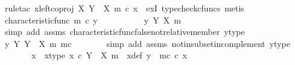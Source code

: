 \begin{isabellebody}
\ {\isacharparenleft}{\kern0pt}rule{\isacharunderscore}{\kern0pt}tac\ x{\isacharequal}{\kern0pt}{\isachardoublequoteopen}left{\isacharunderscore}{\kern0pt}coproj\ X\ {\isacharparenleft}{\kern0pt}Y\ {\isasymsetminus}\ {\isacharparenleft}{\kern0pt}X{\isacharcomma}{\kern0pt}\ m{\isacharparenright}{\kern0pt}{\isacharparenright}{\kern0pt}\ {\isasymcirc}\isactrlsub c\ x{\isachardoublequoteclose}\ \ exI{\isacharcomma}{\kern0pt}\ typecheck{\isacharunderscore}{\kern0pt}cfuncs{\isacharcomma}{\kern0pt}\ metis{\isacharparenright}{\kern0pt}\isanewline
\ \ \isamarkupfalse%
\isanewline
\ \ \ \ \isamarkupfalse%
\ {\isachardoublequoteopen}characteristic{\isacharunderscore}{\kern0pt}func\ m\ {\isasymcirc}\isactrlsub c\ y\ {\isacharequal}{\kern0pt}\ {\isasymf}{\isachardoublequoteclose}\isanewline
\ \ \ \ \isamarkupfalse%
\ \isamarkupfalse%
\ {\isachardoublequoteopen}{\isasymnot}\ y\ {\isasymin}\isactrlbsub Y\isactrlesub \ {\isacharparenleft}{\kern0pt}X{\isacharcomma}{\kern0pt}\ m{\isacharparenright}{\kern0pt}{\isachardoublequoteclose}\isanewline
\ \ \ \ \ \ \isamarkupfalse%
\ {\isacharparenleft}{\kern0pt}simp\ add{\isacharcolon}{\kern0pt}\ assms\ characteristic{\isacharunderscore}{\kern0pt}func{\isacharunderscore}{\kern0pt}false{\isacharunderscore}{\kern0pt}not{\isacharunderscore}{\kern0pt}relative{\isacharunderscore}{\kern0pt}member\ y{\isacharunderscore}{\kern0pt}type{\isacharparenright}{\kern0pt}\isanewline
\ \ \ \ \isamarkupfalse%
\ \isamarkupfalse%
\ {\isachardoublequoteopen}y\ {\isasymin}\isactrlbsub Y\isactrlesub \ {\isacharparenleft}{\kern0pt}Y\ {\isasymsetminus}\ {\isacharparenleft}{\kern0pt}X{\isacharcomma}{\kern0pt}\ m{\isacharparenright}{\kern0pt}{\isacharcomma}{\kern0pt}\ m\isactrlsup c{\isacharparenright}{\kern0pt}{\isachardoublequoteclose}\isanewline
\ \ \ \ \ \ \isamarkupfalse%
\ {\isacharparenleft}{\kern0pt}simp\ add{\isacharcolon}{\kern0pt}\ assms\ not{\isacharunderscore}{\kern0pt}in{\isacharunderscore}{\kern0pt}subset{\isacharunderscore}{\kern0pt}in{\isacharunderscore}{\kern0pt}complement\ y{\isacharunderscore}{\kern0pt}type{\isacharparenright}{\kern0pt}\isanewline
\ \ \ \ \isamarkupfalse%
\ \isamarkupfalse%
\ x{\isacharprime}{\kern0pt}\ \ x{\isacharprime}{\kern0pt}{\isacharunderscore}{\kern0pt}type{\isacharcolon}{\kern0pt}\ {\isachardoublequoteopen}x{\isacharprime}{\kern0pt}\ {\isasymin}\isactrlsub c\ Y\ {\isasymsetminus}\ {\isacharparenleft}{\kern0pt}X{\isacharcomma}{\kern0pt}\ m{\isacharparenright}{\kern0pt}{\isachardoublequoteclose}\ \ x{\isacharprime}{\kern0pt}{\isacharunderscore}{\kern0pt}def{\isacharcolon}{\kern0pt}\ {\isachardoublequoteopen}y\ {\isacharequal}{\kern0pt}\ m\isactrlsup c\ {\isasymcirc}\isactrlsub c\ x{\isacharprime}{\kern0pt}{\isachardoublequoteclose}\isanewline

\end{isabellebody}
